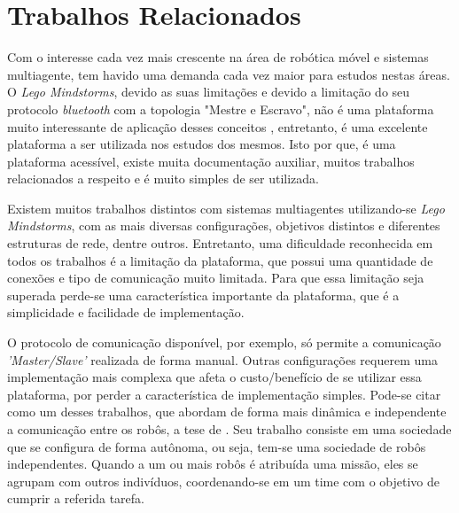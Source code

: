 %

\chapter{Trabalhos Relacionados}
\label{chap:trabalhosRelacionados}
Com o interesse cada vez mais crescente na área de robótica móvel e sistemas multiagente, tem havido uma demanda cada vez maior para estudos nestas áreas. O \emph{Lego Mindstorms\textregistered}, devido as suas limitações e devido a limitação do seu protocolo \emph{bluetooth} com a topologia "Mestre e Escravo", não é uma plataforma muito interessante de aplicação desses conceitos , entretanto, é uma excelente plataforma a ser utilizada nos estudos dos mesmos. Isto por que, é uma plataforma acessível, existe muita documentação auxiliar, muitos trabalhos relacionados a respeito e é muito simples de ser utilizada. %

Existem muitos trabalhos distintos com sistemas multiagentes utilizando-se \emph{Lego Mindstorms\textregistered}, com as mais diversas configurações, objetivos distintos e diferentes estruturas de rede, dentre outros. Entretanto, uma dificuldade reconhecida em todos os trabalhos é a limitação da plataforma, que possui uma quantidade de conexões e tipo de comunicação muito limitada. Para que essa limitação seja superada perde-se uma característica importante da plataforma, que é a simplicidade e facilidade de implementação. 

O protocolo de comunicação disponível, por exemplo, só permite a comunicação \emph{'Master/Slave'} realizada de forma manual. Outras configurações requerem uma implementação mais complexa que afeta o custo/benefício de se utilizar essa plataforma, por perder a característica de implementação simples. Pode-se citar como um desses trabalhos, que abordam de forma mais dinâmica e independente a comunicação entre os robôs, a tese de . Seu trabalho consiste em uma sociedade que se configura de forma autônoma, ou seja, tem-se uma sociedade de robôs independentes. Quando a um ou mais robôs é atribuída uma missão, eles se agrupam com outros indivíduos, coordenando-se em um time com o objetivo de cumprir a referida tarefa. %

